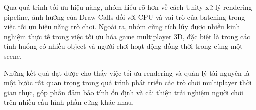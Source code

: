 Qua quá trình tối ưu hiệu năng, nhóm hiểu rõ hơn về cách Unity xử lý rendering pipeline, ảnh hưởng của Draw Calls đối với CPU và vai trò của batching trong việc tối ưu hiệu năng trò chơi. Ngoài ra, nhóm cũng tích lũy được nhiều kinh nghiệm thực tế trong việc tối ưu hóa game multiplayer 3D, đặc biệt là trong các tình huống có nhiều object và người chơi hoạt động đồng thời trong cùng một scene.

Những kết quả đạt được cho thấy việc tối ưu rendering và quản lý tài nguyên là một bước rất quan trọng trong quá trình phát triển các trò chơi multiplayer thời gian thực, góp phần đảm bảo tính ổn định và cải thiện trải nghiệm người chơi trên nhiều cấu hình phần cứng khác nhau.